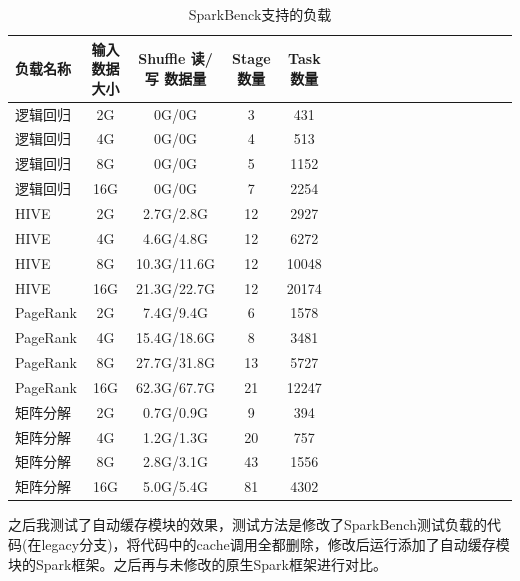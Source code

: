 \begin{table}
 \caption{SparkBenck支持的负载}
 \label{tab:workload}
 \begin{tabular}{lccccccccccccccccl}
  \toprule
  负载名称 & 输入数据大小 & Shuffle 读/写 数据量 & Stage 数量 & Task 数量 \\
  \midrule
  逻辑回归 & 2G & 0G/0G & 3 & 431 \\  
  逻辑回归 & 4G & 0G/0G & 4 & 513 \\  
  逻辑回归 & 8G & 0G/0G & 5 & 1152 \\  
  逻辑回归 & 16G & 0G/0G & 7 & 2254 \\  
  HIVE & 2G & 2.7G/2.8G & 12 & 2927 \\  
  HIVE & 4G & 4.6G/4.8G & 12 & 6272 \\  
  HIVE & 8G & 10.3G/11.6G & 12 & 10048 \\  
  HIVE & 16G & 21.3G/22.7G & 12 & 20174 \\ 
  PageRank & 2G & 7.4G/9.4G & 6 & 1578 \\  
  PageRank & 4G & 15.4G/18.6G & 8 & 3481 \\  
  PageRank & 8G & 27.7G/31.8G & 13 & 5727 \\  
  PageRank & 16G & 62.3G/67.7G & 21 & 12247 \\
  矩阵分解 & 2G & 0.7G/0.9G & 9 & 394 \\  
  矩阵分解 & 4G & 1.2G/1.3G & 20 & 757 \\  
  矩阵分解 & 8G & 2.8G/3.1G & 43 & 1556 \\  
  矩阵分解 & 16G & 5.0G/5.4G & 81 & 4302\\  
  \bottomrule
 \end{tabular}
\end{table}

之后我测试了自动缓存模块的效果，测试方法是修改了SparkBench测试负载的代码(在legacy分支)，将代码中的cache调用全都删除，修改后运行添加了自动缓存模块的Spark框架。之后再与未修改的原生Spark框架进行对比。

